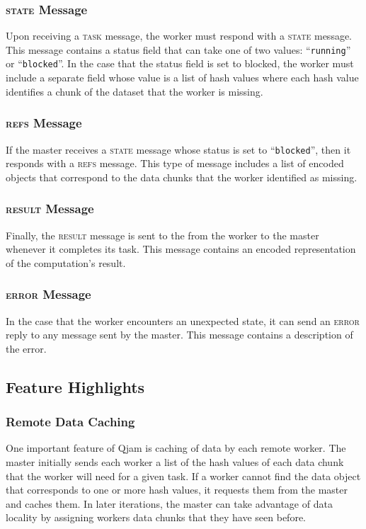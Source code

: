 \documentclass[%
  final,
  notitlepage,
  narroweqnarray,
  inline,
]{ieee}
\begin{document}
\subsubsection{\textsc{state} Message}

Upon receiving a \textsc{task} message, the worker must respond with a
\textsc{state} message. This message contains a status field that can take one
of two values: ``\texttt{running}'' or ``\texttt{blocked}''. In the case that
the status field is set to blocked, the worker must include a separate field
whose value is a list of hash values where each hash value identifies a chunk
of the dataset that the worker is missing.


\subsubsection{\textsc{refs} Message}

If the master receives a \textsc{state} message whose status is set to
``\texttt{blocked}'', then it responds with a \textsc{refs} message. This type
of message includes a list of encoded objects that correspond to the data
chunks that the worker identified as missing.


\subsubsection{\textsc{result} Message}

Finally, the \textsc{result} message is sent to the from the worker to the
master whenever it completes its task. This message contains an encoded
representation of the computation's result.


\subsubsection{\textsc{error} Message}

In the case that the worker encounters an unexpected state, it can send an
\textsc{error} reply to any message sent by the master. This message contains
a description of the error.


\subsection{Feature Highlights}
\label{Implementation}

\subsubsection{Remote Data Caching}
One important feature of Qjam is caching of data by each remote worker. The
master initially sends each worker a list of the hash values of each data chunk
that the worker will need for a given task. If a worker cannot find the data
object that corresponds to one or more hash values, it requests them from the
master and caches them. In later iterations, the master can take advantage of
data locality by assigning workers data chunks that they have seen before.
\end{document}
